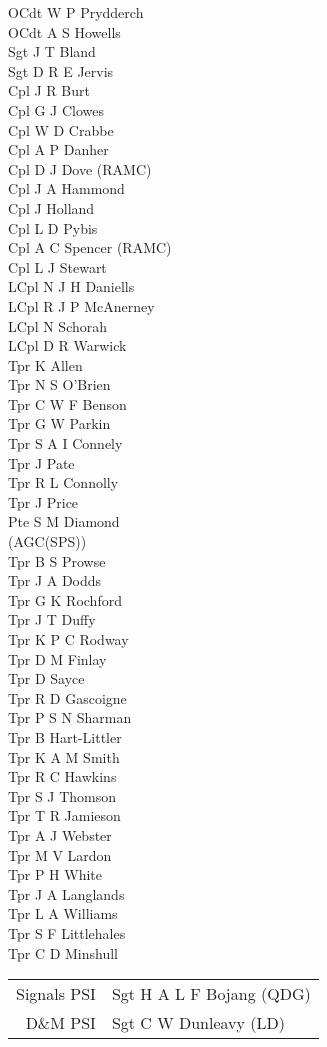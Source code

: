 \begin{multicols}{3}
  \small
  \noindent
  OCdt W P Prydderch \\
  OCdt A S Howells \\
  Sgt J T Bland \\
  Sgt D R E Jervis \\
  Cpl J R Burt \\
  Cpl G J Clowes \\
  Cpl W D Crabbe \\
  Cpl A P Danher \\
  Cpl D J Dove (RAMC) \\
  Cpl J A Hammond \\
  Cpl J Holland \\
  Cpl L D Pybis \\
  Cpl A C Spencer (RAMC) \\
  Cpl L J Stewart \\
  LCpl N J H Daniells \\
  LCpl R J P McAnerney \\
  LCpl N Schorah \\
  LCpl D R Warwick \\
  Tpr K Allen \\
  Tpr N S O'Brien \\
  Tpr C W F Benson \\
  Tpr G W Parkin \\
  Tpr S A I Connely \\
  Tpr J Pate \\
  Tpr R L Connolly \\
  Tpr J Price \\
  Pte S M Diamond \\ \indent (AGC(SPS)) \\
  Tpr B S Prowse \\
  Tpr J A Dodds \\
  Tpr G K Rochford \\
  Tpr J T Duffy \\
  Tpr K P C Rodway \\
  Tpr D M Finlay \\
  Tpr D Sayce \\
  Tpr R D Gascoigne \\
  Tpr P S N Sharman \\
  Tpr B Hart-Littler \\
  Tpr K A M Smith \\
  Tpr R C Hawkins \\
  Tpr S J Thomson \\
  Tpr T R Jamieson \\
  Tpr A J Webster \\
  Tpr M V Lardon \\
  Tpr P H White \\
  Tpr J A Langlands \\
  Tpr L A Williams \\
  Tpr S F Littlehales \\
  Tpr C D Minshull \\
\end{multicols}

\vspace*{5mm}

\begin{center}
  \small
  \begin{tabular}{rl}
    Signals PSI & Sgt H A L F Bojang (QDG) \\
    D\&M PSI & Sgt C W Dunleavy (LD) \\
  \end{tabular}
\end{center}
